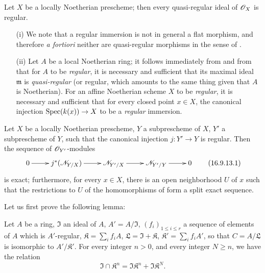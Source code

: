 \begin{corollary}[16.9.11]
\label{IV.16.9.11}
Let $X$ be a locally Noetherian prescheme;
then every quasi-regular ideal of $\mathscr{O}_X$ is regular.
\end{corollary}

\begin{remarks}[16.9.12]
\label{IV.16.9.12}
\begin{enumerate}
  \item[\rm{(i)}] We note that a regular immersion is not in general a flat morphism, and therefore \textit{a fortiori} neither are quasi-regular morphisms in the sense of .
  \item[\rm{(ii)}] Let $A$ be a local Noetherian ring;
  it follows immediately from  and from  that for $A$ to be \emph{regular}, it is necessary and sufficient that its maximal ideal $\mathfrak{m}$ is \emph{quasi-regular} (or regular, which amounts to the same thing  given that $A$ is Noetherian).
  For an affine Noetherian scheme $X$ to be \emph{regular}, it is necessary and sufficient that for every closed point $x \in X$, the canonical injection $\Spec(\kres(x)) \to X$ to be a \emph{regular} immersion.
\end{enumerate}
\end{remarks}

\begin{proposition}[16.9.13]
\label{IV.16.9.13}
Let $X$ be a locally Noetherian prescheme, $Y$ a subprescheme of $X$, $Y'$ a subprescheme of $Y$, such that the canonical injection $j:Y' \to Y$ is regular. 
Then the sequence of $\mathscr{O}_{Y'}$-modules
\[
  \label{IV.16.9.13.1}
  \xymatrix{
    0 \ar[r] & j^*(\sh{N}_{Y/X}) \ar[r] & \sh{N}_{Y'/X} \ar[r] & \sh{N}_{Y'/Y} \ar[r] & 0
  }
  \tag{16.9.13.1}
\]
is exact;
furthermore, for every $x \in X$, there is an open neighborhood $U$ of $x$ such that the restrictions to $U$ of the homomorphisms of  form a split exact sequence.
\end{proposition}

Let us first prove the following lemma:

\begin{lemma}[16.9.13.2]
\label{IV.16.9.13.2}
Let $A$ be a ring, $\mathfrak{I}$ an ideal of $A$, $A' = A/\mathfrak{I}$, $(f_i)_{1 \leq i \leq r}$ a sequence of elements of $A$ which is $A'$-regular, $\mathfrak{K} = \sum_i f_i A$, $\mathfrak{L} = \mathfrak{I} + \mathfrak{K}$, $\mathfrak{K}' = \sum_i f_i A'$, so that $C = A/\mathfrak{L}$ is isomorphic to $A'/\mathfrak{K}'$.
For every integer $n > 0$, and every integer $N \geq n$, we have the relation
\[
  \label{IV.16.9.13.3}
  \mathfrak{I} \cap \mathfrak{K}^n = \mathfrak{I}\mathfrak{K}^n + \mathfrak{I}\mathfrak{K}^N.
  \tag{16.9.13.3}
\]
\end{lemma}

